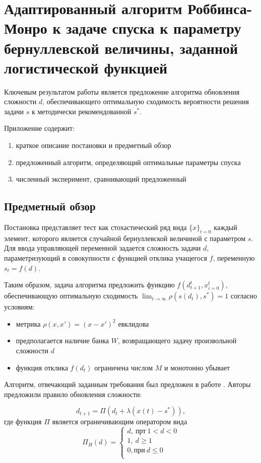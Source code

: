 \documentclass{mipt-thesis-bs}
\begin{document}
\chapter*{Адаптированный алгоритм Роббинса-Монро к задаче спуска к параметру бернуллевской величины, заданной логистической функцией}


Ключевым результатом работы является предложение алгоритма обновления сложности $d$, обеспечивающего оптимальную сходимость вероятности решения задачи $s$ к методически рекомендованной $s^*$.

Приложение содержит: \begin{enumerate}
    \item краткое описание постановки и предметный обзор
    \item предложенный алгоритм, определяющий оптимальные параметры спуска  
    \item численный эксперимент, сравнивающий предложенный 
\end{enumerate} 

\section{Предметный обзор}

Постановка представляет тест как стохастический ряд вида $\{x\}_{t=0}$ каждый элемент, которого является случайной бернуллевской величиной с параметром $s$. 
Для ввода управляющей переменной задается сложность задачи $d$, параметризующий в совокупности с функцией отклика учащегося $f$, переменную $s_t = f(d)$.

 Таким образом, задача алгоритма предложить функцию $f(d_{t+1}^t,{x}_{i=0}^t)$, обеспечивающую оптимальную сходимость $\lim_{t \rightarrow \infty} \rho(s(d_t),s^*) =1$ согласно условиям:
 \begin{itemize}
    \item метрика $\rho(x,x') = (x-x')^2$ евклидова
    \item предполагается наличие банка $W$, возвращающего задачу произвольной сложности $d$
    \item функция отклика $f(d_t)$ ограничена числом $M$ и монотонно убывает
\end{itemize}

Алгоритм, отвечающий заданным требования  был предложен в работе \cite{yazidi2020balanced}. Авторы предложили правило обновления сложности:

\begin{equation}
    d_{t+1} = \Pi(d_t+\lambda (x(t) -s^*)),
    \label{yazidi}
\end{equation}
где функция $\Pi$ является ограничивающим оператором вида
\begin{equation}
    \Pi_H(d) = \left\{
        \begin{array}{ll}
            d,\ \text{прт}\ 1<d<0 \\
            1,\ d\ge 1\\
            0, \text{при} \ d \le 0\\
        \end{array}
    \right.
\end{equation}
\end{document}
